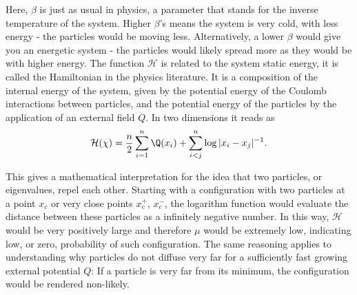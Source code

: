 Here, $\beta$ is just as usual in physics, a parameter that stands for the inverse temperature of the system. Higher $\beta$'s means the system is very cold, with less energy - the particles would be moving less. Alternatively, a lower $\beta$ would give you an energetic system - the particles would likely spread more as they would be with higher energy. The function $\mathcal{H}$ is related to the system static energy, it is called the Hamiltonian in the physics literature. It is a composition of the internal energy of the system, given by the potential energy of the Coulomb interactions between particles, and the potential energy of the particles by the application of an external field $Q$. In two dimensions it reads as
\begin{equation}
	\mathcal{H}(\chi) = \frac{n}{2} \sum_{i = 1}^{n} \Q(x_i) + \sum_{i < j}^{n} \log|x_i - x_j|^{-1}.
\end{equation}

This gives a mathematical interpretation for the idea that two particles, or eigenvalues, repel each other. Starting with a configuration with two particles at a point $x_c$ or very close points $x_c^+$, $x_c^-$, the logarithm function would evaluate the distance between these particles as a infinitely negative number. In this way, $\mathcal{H}$ would be very positively large and therefore $\mu$ would be extremely low, indicating low, or zero, probability of such configuration. The same reasoning applies to understanding why particles do not diffuse very far for a sufficiently fast growing external potential $Q$: If a particle is very far from its minimum, the configuration would be rendered non-likely. %

